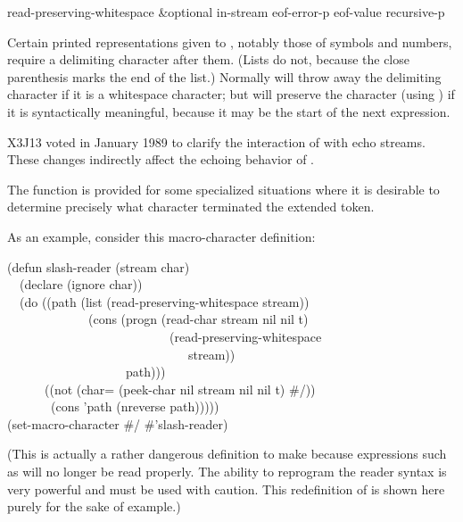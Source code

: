 \begin{defun}[Function]
read-preserving-whitespace &optional in-stream eof-error-p eof-value recursive-p

Certain printed representations given to , notably those of symbols
and numbers, require a delimiting character after them.  (Lists do not, because
the close parenthesis marks the end of the list.)
Normally  will throw away the delimiting character if it is a
whitespace character;
but  will preserve the character (using ) if it is
syntactically meaningful, because it may be the start of the next expression.

\begin{new}
X3J13 voted in January 1989
to clarify the interaction of 
with echo streams.  These changes indirectly affect the echoing behavior
of .
\end{new}

The function  is provided for some specialized
situations where it is desirable to determine precisely what character
terminated the extended token.

As an example, consider this macro-character definition:
\begin{lisp}
(defun slash-reader (stream char) \\
~~(declare (ignore char)) \\
~~(do ((path (list (read-preserving-whitespace stream)) \\
~~~~~~~~~~~~~(cons (progn (read-char stream nil nil t) \\
~~~~~~~~~~~~~~~~~~~~~~~~~~(read-preserving-whitespace \\
~~~~~~~~~~~~~~~~~~~~~~~~~~~~~stream)) \\
~~~~~~~~~~~~~~~~~~~path))) \\
~~~~~~((not (char= (peek-char nil stream nil nil t) \#{\Xbackslash}/)) \\
~~~~~~~(cons 'path (nreverse path))))) \\
(set-macro-character \#{\Xbackslash}/ \#'slash-reader)
\end{lisp}
(This is actually a rather dangerous definition to make because
expressions such as  will no longer be read properly.
The ability to reprogram the reader syntax is very powerful and
must be used with caution.  This redefinition of \cdf{/} is shown
here purely for the sake of example.)


\end{defun}
